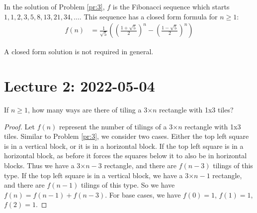 \documentclass[12pt]{article}
\begin{document}
    \begin{myrem}{}{}
        In the solution of Problem \ref{pr:3}, $f$ is the Fibonacci sequence which starts $1, 1, 2, 3, 5, 8, 13, 21, 34, \dots$. This sequence has a closed form formula for $n\geq1$:
        \begin{align*}
            f(n)&=\frac{1}{\sqrt{5}}\left(\left(\frac{1+\sqrt{5}}{2}\right)^n-\left(\frac{1-\sqrt{5}}{2}\right)^n\right)
        \end{align*}

        A closed form solution is not required in general.
    \end{myrem}

    \newpage
    \section{Lecture 2: 2022-05-04}
    \begin{myprob}{}{}
        If $n\geq1$, how many ways are there of tiling a 3$\times n$ rectangle with 1x3 tiles?

        \begin{proof}
            Let $f(n)$ represent the number of tilings of a 3$\times n$ rectangle with 1x3 tiles. Similar to Problem \ref{pr:3}, we consider two cases. Either the top left square is in a vertical block, or it is in a horizontal block. If the top left square is in a horizontal block, as before it forces the squares below it to also be in horizontal blocks. Thus we have a 3$\times n-3$ rectangle, and there are $f(n-3)$ tilings of this type. If the top left square is in a vertical block, we have a 3$\times n-1$ rectangle, and there are $f(n-1)$ tilings of this type. So we have $f(n)=f(n-1)+f(n-3)$. For base cases, we have $f(0)=1$, $f(1)=1$, $f(2)=1$.
        \end{proof}
    \end{myprob}
\end{document}
